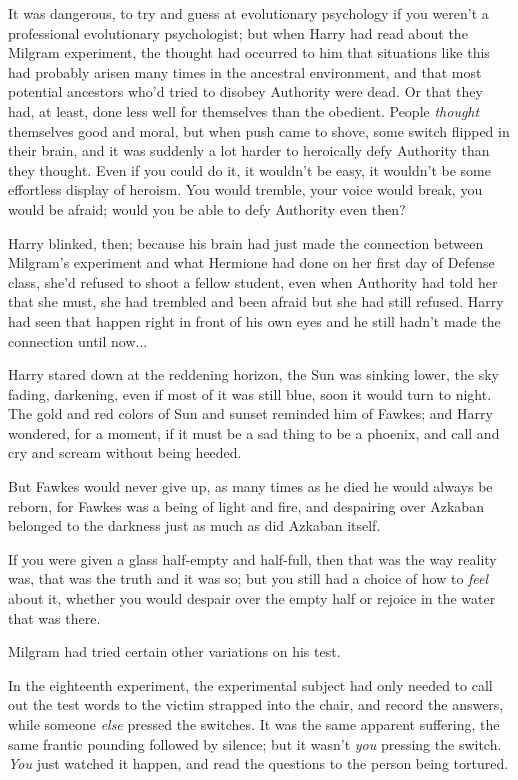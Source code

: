 It was dangerous, to try and guess at evolutionary psychology if you
weren't a professional evolutionary psychologist; but when Harry had
read about the Milgram experiment, the thought had occurred to him that
situations like this had probably arisen many times in the ancestral
environment, and that most potential ancestors who'd tried to disobey
Authority were dead. Or that they had, at least, done less well for
themselves than the obedient. People \emph{thought} themselves good and
moral, but when push came to shove, some switch flipped in their brain,
and it was suddenly a lot harder to heroically defy Authority than they
thought. Even if you could do it, it wouldn't be easy, it wouldn't be
some effortless display of heroism. You would tremble, your voice would
break, you would be afraid; would you be able to defy Authority even
then?

Harry blinked, then; because his brain had just made the connection
between Milgram's experiment and what Hermione had done on her first day
of Defense class, she'd refused to shoot a fellow student, even when
Authority had told her that she must, she had trembled and been afraid
but she had still refused. Harry had seen that happen right in front of
his own eyes and he still hadn't made the connection until now...

Harry stared down at the reddening horizon, the Sun was sinking lower,
the sky fading, darkening, even if most of it was still blue, soon it
would turn to night. The gold and red colors of Sun and sunset reminded
him of Fawkes; and Harry wondered, for a moment, if it must be a sad
thing to be a phoenix, and call and cry and scream without being heeded.

But Fawkes would never give up, as many times as he died he would always
be reborn, for Fawkes was a being of light and fire, and despairing over
Azkaban belonged to the darkness just as much as did Azkaban itself.

If you were given a glass half-empty and half-full, then that was the
way reality was, that was the truth and it was so; but you still had a
choice of how to \emph{feel} about it, whether you would despair over
the empty half or rejoice in the water that was there.

Milgram had tried certain other variations on his test.

In the eighteenth experiment, the experimental subject had only needed
to call out the test words to the victim strapped into the chair, and
record the answers, while someone \emph{else} pressed the switches. It
was the same apparent suffering, the same frantic pounding followed by
silence; but it wasn't \emph{you} pressing the switch. \emph{You} just
watched it happen, and read the questions to the person being tortured.

